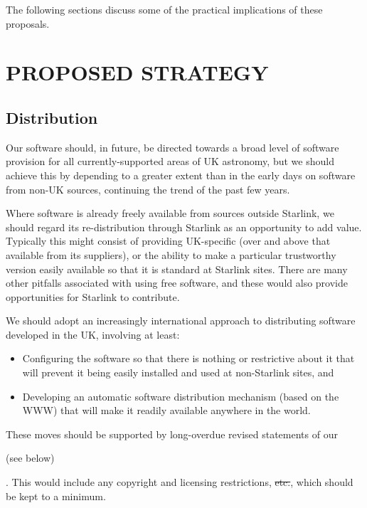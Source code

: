 The following sections discuss some of the practical implications of
these proposals.

\section{PROPOSED STRATEGY}

\subsection{Distribution}

Our software \st{} should, in future, be directed towards
a broad level of software provision for all currently-supported areas
of UK astronomy, but we should achieve this by depending to a greater
extent than in the early days on software from non-UK sources,
continuing the trend of the past few years.

Where software is already freely available from sources outside
Starlink, we should regard its re-distribution through Starlink as
an opportunity to add value. Typically this might consist of providing
UK-specific \st{} (over and above that available from its
suppliers), or the ability to make a particular trustworthy version
easily available so that it is standard at Starlink sites.  There are
many other pitfalls associated with using free software, and these
would also provide opportunities for Starlink to contribute.

We should adopt an increasingly international approach to distributing
software developed in the UK, involving at least:
\begin{itemize}
\item Configuring the software so that there is nothing 
or restrictive about it that will prevent it being easily installed
and used at non-Starlink sites, and
\item Developing an automatic software distribution mechanism (based on the
WWW) that will make it readily available anywhere in the world.
\end{itemize}

These moves should be supported by long-overdue revised statements of
our \begin{latexonly} (see
below)\end{latexonly}. This would include any copyright and licensing
restrictions, \st{etc.}, which should be kept to a minimum.

